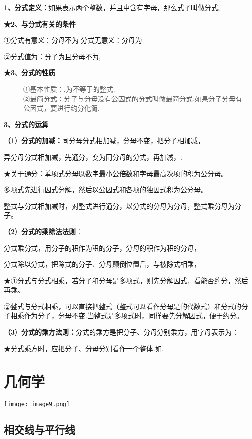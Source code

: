 \textbf{1、分式定义：}如果表示两个整数，并且中含有字母，那么式子叫做分式。

\textbf{★2、与分式有关的条件}

①分式有意义：分母不为 分式无意义：分母为

②分式值为：分子为且分母不为,

\textbf{★3、分式的性质}

\begin{quote}
①基本性质：,为不等于的整式.\\
②最简分式：分子与分母没有公因式的分式叫做最简分式.如果分子分母有公因式，要进行约分化简.
\end{quote}

\textbf{3、分式的运算}

\textbf{（1）分式的加减：}同分母分式相加减，分母不变，把分子相加减，

异分母分式相加减，先通分，变为同分母的分式，再加减，.

★关于通分：单项式分母以数字最小公倍数和字母最高次项的积为公分母。

多项式先进行因式分解，然后以公因式和各项的独因式积为公分母。

整式与分式相加减时，对整式进行通分，以分式的分母为分母，整式乘分母为分子。

\textbf{（2）分式的乘除法法则：}

分式乘分式，用分子的积作为积的分子，分母的积作为积的分母，

分式除以分式，把除式的分子、分母颠倒位置后，与被除式相乘，

★①分式与分式相乘，若分子和分母是多项式，则先分解因式，看能否约分，然后再乘。

②整式与分式相乘，可以直接把整式（整式可以看作分母是的代数式）和分式的分子相乘作为分子，分母不变.当整式是多项式时，同样要先分解因式，便于约分。

\textbf{（3）分式的乘方法则：}分式的乘方是把分子、分母分别乘方，用字母表示为：

★分式乘方时，应把分子、分母分别看作一个整体.如.

\hypertarget{ux51e0ux4f55ux5b66}{%
\section{\texorpdfstring{ 几何学}{ 几何学}}\label{ux51e0ux4f55ux5b66}}

\texttt{[image: image9.png]}

\hypertarget{ux76f8ux4ea4ux7ebfux4e0eux5e73ux884cux7ebf}{%
\subsection{\texorpdfstring{
相交线与平行线}{ 相交线与平行线}}\label{ux76f8ux4ea4ux7ebfux4e0eux5e73ux884cux7ebf}}


